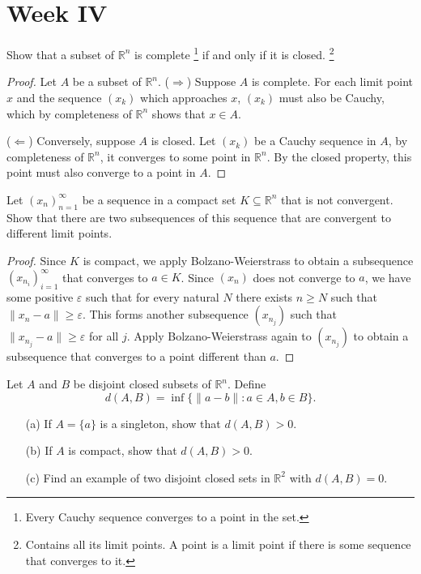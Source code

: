 \documentclass[../main.tex]{subfiles}
\begin{document}
\section{Week IV}

\begin{problem}[\S4.3 H]
Show that a subset of $\mathbb{R}^n$ is complete
\footnote{Every Cauchy sequence converges to a point in the set.}
if and only if it is closed.
\footnote{Contains all its limit points.
A point is a limit point if there is some sequence that converges to it.}
\end{problem}

\begin{proof}
	Let $A$ be a subset of $\mathbb{R}^n$.
	($\Rightarrow$) Suppose $A$ is complete.
	For each limit point $x$ and the sequence $(x_k)$ which approaches $x$, $(x_k)$ must also be Cauchy, which by completeness of $\mathbb{R}^n$ shows that $x \in A$.

	($\Leftarrow$) Conversely, suppose $A$ is closed.
	Let $(x_k)$ be a Cauchy sequence in $A$, by completeness of $\mathbb{R}^n$, it converges to some point in $\mathbb{R}^n$.
	By the closed property, this point must also converge to a point in $A$.
\end{proof}

\begin{problem}[\S4.4 F]
Let $(x_n)_{n = 1}^\infty$ be a sequence in a compact set $K \subseteq \mathbb{R}^n$ that is not convergent.
Show that there are two subsequences of this sequence that are convergent to different limit points.
\end{problem}

\begin{proof}
	Since $K$ is compact, we apply Bolzano-Weierstrass to obtain a subsequence $(x_{n_i})_{i = 1}^\infty$ that converges to $a \in K$.
	Since $(x_n)$ does not converge to $a$, we have some positive $\varepsilon$ such that for every natural $N$ there exists $n \ge N$ such that $\|x_n - a\| \ge \varepsilon$.
	This forms another subsequence $(x_{n_j})$ such that $\|x_{n_j} - a\| \ge \varepsilon$ for all $j$.
	Apply Bolzano-Weierstrass again to $(x_{n_j})$ to obtain a subsequence that converges to a point different than $a$.
\end{proof}

\begin{problem}[\S4.4 I]
Let $A$ and $B$ be disjoint closed subsets of $\mathbb{R}^n$.
Define
\[
	d(A, B) = \inf\{\|a - b\| : a \in A, b \in B\}.
\]
\begin{itemize}
	\item[(a)] If $A = \{a\}$ is a singleton, show that $d(A, B) > 0$.
	\item[(b)] If $A$ is compact, show that $d(A, B) > 0$.
	\item[(c)] Find an example of two disjoint closed sets in $\mathbb{R}^2$ with $d(A, B) = 0$.
\end{itemize}
\end{problem}
\end{document}
